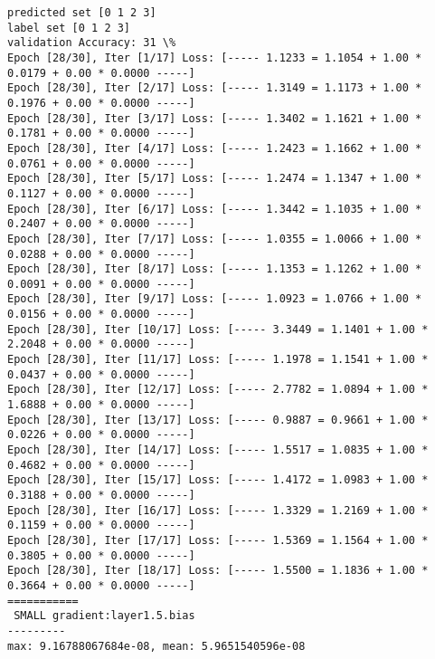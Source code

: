 \documentclass[11pt]{article}
\begin{document}
    \begin{Verbatim}[commandchars=\\\{\}]
predicted set [0 1 2 3]
label set [0 1 2 3]
validation Accuracy: 31 \%
Epoch [28/30], Iter [1/17] Loss: [----- 1.1233 = 1.1054 + 1.00 * 0.0179 + 0.00 * 0.0000 -----]
Epoch [28/30], Iter [2/17] Loss: [----- 1.3149 = 1.1173 + 1.00 * 0.1976 + 0.00 * 0.0000 -----]
Epoch [28/30], Iter [3/17] Loss: [----- 1.3402 = 1.1621 + 1.00 * 0.1781 + 0.00 * 0.0000 -----]
Epoch [28/30], Iter [4/17] Loss: [----- 1.2423 = 1.1662 + 1.00 * 0.0761 + 0.00 * 0.0000 -----]
Epoch [28/30], Iter [5/17] Loss: [----- 1.2474 = 1.1347 + 1.00 * 0.1127 + 0.00 * 0.0000 -----]
Epoch [28/30], Iter [6/17] Loss: [----- 1.3442 = 1.1035 + 1.00 * 0.2407 + 0.00 * 0.0000 -----]
Epoch [28/30], Iter [7/17] Loss: [----- 1.0355 = 1.0066 + 1.00 * 0.0288 + 0.00 * 0.0000 -----]
Epoch [28/30], Iter [8/17] Loss: [----- 1.1353 = 1.1262 + 1.00 * 0.0091 + 0.00 * 0.0000 -----]
Epoch [28/30], Iter [9/17] Loss: [----- 1.0923 = 1.0766 + 1.00 * 0.0156 + 0.00 * 0.0000 -----]
Epoch [28/30], Iter [10/17] Loss: [----- 3.3449 = 1.1401 + 1.00 * 2.2048 + 0.00 * 0.0000 -----]
Epoch [28/30], Iter [11/17] Loss: [----- 1.1978 = 1.1541 + 1.00 * 0.0437 + 0.00 * 0.0000 -----]
Epoch [28/30], Iter [12/17] Loss: [----- 2.7782 = 1.0894 + 1.00 * 1.6888 + 0.00 * 0.0000 -----]
Epoch [28/30], Iter [13/17] Loss: [----- 0.9887 = 0.9661 + 1.00 * 0.0226 + 0.00 * 0.0000 -----]
Epoch [28/30], Iter [14/17] Loss: [----- 1.5517 = 1.0835 + 1.00 * 0.4682 + 0.00 * 0.0000 -----]
Epoch [28/30], Iter [15/17] Loss: [----- 1.4172 = 1.0983 + 1.00 * 0.3188 + 0.00 * 0.0000 -----]
Epoch [28/30], Iter [16/17] Loss: [----- 1.3329 = 1.2169 + 1.00 * 0.1159 + 0.00 * 0.0000 -----]
Epoch [28/30], Iter [17/17] Loss: [----- 1.5369 = 1.1564 + 1.00 * 0.3805 + 0.00 * 0.0000 -----]
Epoch [28/30], Iter [18/17] Loss: [----- 1.5500 = 1.1836 + 1.00 * 0.3664 + 0.00 * 0.0000 -----]
===========
 SMALL gradient:layer1.5.bias
---------
max: 9.16788067684e-08, mean: 5.9651540596e-08

    \end{Verbatim}

    \begin{center}
    \end{center}
    { \hspace*{\fill} \\}
    
    \begin{center}
    \end{center}
    { \hspace*{\fill} \\}
    
\end{document}
